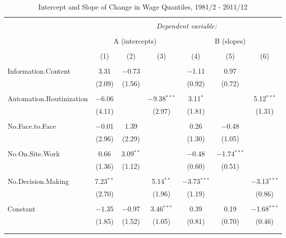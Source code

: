 \documentclass{article}
\begin{document}
\begin{table}[!htbp] \centering 
  \caption{Intercept and Slope of Change in Wage Quantiles, 1981/2 - 2011/12} 
  \label{} 
\begin{tabular}{@{\extracolsep{5pt}}lcccccc} 
\\[-1.8ex]\hline 
\hline \\[-1.8ex] 
 & \multicolumn{6}{c}{\textit{Dependent variable:}} \\ 
\cline{2-7} 
\\[-1.8ex] & \multicolumn{3}{c}{A (intercepts)} & \multicolumn{3}{c}{B (slopes)} \\ 
\\[-1.8ex] & (1) & (2) & (3) & (4) & (5) & (6)\\ 
\hline \\[-1.8ex] 
 Information.Content & 3.31 & $-$0.73 &  & $-$1.11 & 0.97 &  \\ 
  & (2.09) & (1.56) &  & (0.92) & (0.72) &  \\ 
  & & & & & & \\ 
 Automation.Routinization & $-$6.06 &  & $-$9.38$^{***}$ & 3.11$^{*}$ &  & 5.12$^{***}$ \\ 
  & (4.11) &  & (2.97) & (1.81) &  & (1.31) \\ 
  & & & & & & \\ 
 No.Face.to.Face & $-$0.01 & 1.39 &  & 0.26 & $-$0.48 &  \\ 
  & (2.96) & (2.29) &  & (1.30) & (1.05) &  \\ 
  & & & & & & \\ 
 No.On.Site.Work & 0.66 & 3.09$^{**}$ &  & $-$0.48 & $-$1.74$^{***}$ &  \\ 
  & (1.36) & (1.12) &  & (0.60) & (0.51) &  \\ 
  & & & & & & \\ 
 No.Decision.Making & 7.23$^{**}$ &  & 5.14$^{**}$ & $-$3.73$^{***}$ &  & $-$3.13$^{***}$ \\ 
  & (2.70) &  & (1.96) & (1.19) &  & (0.86) \\ 
  & & & & & & \\ 
 Constant & $-$1.35 & $-$0.97 & 3.46$^{***}$ & 0.39 & 0.19 & $-$1.68$^{***}$ \\ 
  & (1.85) & (1.52) & (1.05) & (0.81) & (0.70) & (0.46) \\ 
  & & & & & & \\ 
\hline \\[-1.8ex] 

\end{tabular}
\end{table}
\end{document}
